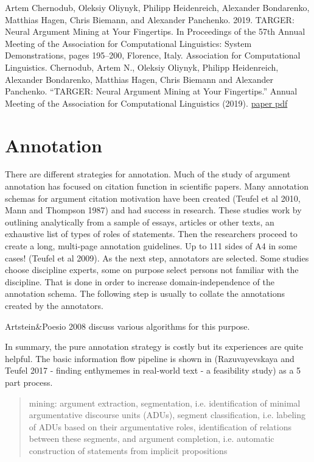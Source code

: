\documentclass{article}
\begin{document}
Artem Chernodub, Oleksiy Oliynyk, Philipp Heidenreich, Alexander Bondarenko, Matthias Hagen, Chris Biemann, and Alexander Panchenko. 2019. TARGER: Neural Argument Mining at Your Fingertips. In Proceedings of the 57th Annual Meeting of the Association for Computational Linguistics: System Demonstrations, pages 195–200, Florence, Italy. Association for Computational Linguistics.
Chernodub, Artem N., Oleksiy Oliynyk, Philipp Heidenreich, Alexander Bondarenko, Matthias Hagen, Chris Biemann and Alexander Panchenko. “TARGER: Neural Argument Mining at Your Fingertips.” Annual Meeting of the Association for Computational Linguistics (2019).
\href{https://aclanthology.org/P19-3031/}{paper pdf}

\section{Annotation}
There are different strategies for annotation. Much of the study of argument annotation has focused on citation function in scientific papers.
Many annotation schemas for argument citation motivation have been created (Teufel et al 2010, Mann and Thompson 1987) and had success in research.
These studies work by outlining analytically from a sample of essays, articles or other texts, an exhaustive list of types of roles of statements.
Then the researchers proceed to create a long, multi-page annotation guidelines. Up to 111 sides of A4 in some cases! (Teufel et al 2009).
As the next step, annotators are selected. Some studies choose discipline experts, some on purpose select persons not familiar with the discipline.
That is done in order to increase domain-independence of the annotation schema.
The following step is usually to collate the annotations created by the annotators. 

Artstein&Poesio 2008 discuss various algorithms for this purpose.

In summary, the pure annotation strategy is costly but its experiences are quite helpful. The basic information flow pipeline is shown in (Razuvayevskaya and Teufel 2017 - finding enthymemes in real-world text - a feasibility study) as a 5 part process.
\begin{quote}
   mining: argument extraction, segmentation, i.e. identification of minimal argumentative discourse units (ADUs), segment classification, i.e. labeling of ADUs based on their argumentative roles, identification of relations between these segments, and argument completion, i.e. automatic construction of statements from implicit propositions
\end{quote}
\cite[page 114]{Tefuel2017}
\end{document}
